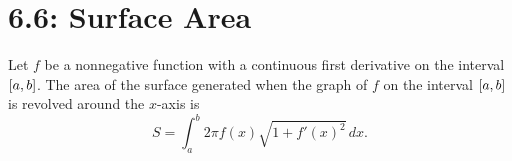 \documentclass[../mathNotesPreamble]{subfiles}
\begin{document}
  \section{6.6: Surface Area}

  \begin{defn*}
    Let $f$ be a nonnegative function with a continuous first derivative on the interval ${\left[a,b\right]}$. The area of the surface generated when the graph of $f$ on the interval ${\left[a,b\right]}$ is revolved around the $x$-axis is
      \[S=\int_a^b 2\pi f(x)\sqrt{1+f'(x)^2}\,dx.\]
  \end{defn*}

  
\end{document}
